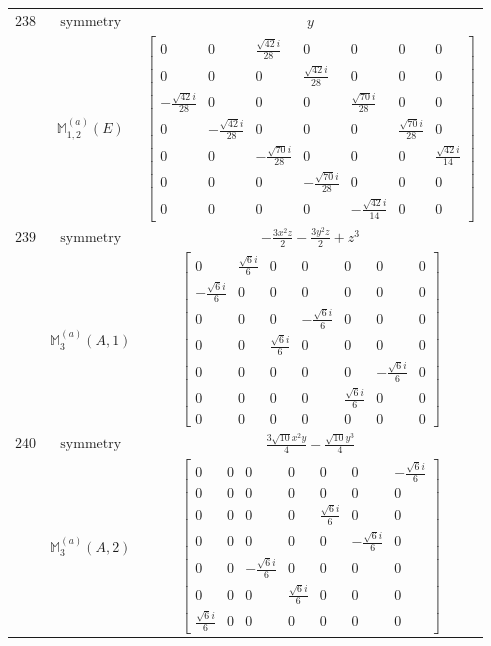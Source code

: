 \documentclass[fleqn,8pt,landscape]{jsarticle}
\begin{document}
\begin{longtable}{ccc}
$ 238 $ & $ \text{symmetry} $ & $ y $ \\
$  $ & $ \mathbb{M}_{1,2}^{(a)}(E) $ & $ \begin{bmatrix} 0 & 0 & \frac{\sqrt{42} i}{28} & 0 & 0 & 0 & 0 \\ 0 & 0 & 0 & \frac{\sqrt{42} i}{28} & 0 & 0 & 0 \\ - \frac{\sqrt{42} i}{28} & 0 & 0 & 0 & \frac{\sqrt{70} i}{28} & 0 & 0 \\ 0 & - \frac{\sqrt{42} i}{28} & 0 & 0 & 0 & \frac{\sqrt{70} i}{28} & 0 \\ 0 & 0 & - \frac{\sqrt{70} i}{28} & 0 & 0 & 0 & \frac{\sqrt{42} i}{14} \\ 0 & 0 & 0 & - \frac{\sqrt{70} i}{28} & 0 & 0 & 0 \\ 0 & 0 & 0 & 0 & - \frac{\sqrt{42} i}{14} & 0 & 0 \end{bmatrix} $ \\ \hline
$ 239 $ & $ \text{symmetry} $ & $ - \frac{3 x^{2} z}{2} - \frac{3 y^{2} z}{2} + z^{3} $ \\
$  $ & $ \mathbb{M}_{3}^{(a)}(A,1) $ & $ \begin{bmatrix} 0 & \frac{\sqrt{6} i}{6} & 0 & 0 & 0 & 0 & 0 \\ - \frac{\sqrt{6} i}{6} & 0 & 0 & 0 & 0 & 0 & 0 \\ 0 & 0 & 0 & - \frac{\sqrt{6} i}{6} & 0 & 0 & 0 \\ 0 & 0 & \frac{\sqrt{6} i}{6} & 0 & 0 & 0 & 0 \\ 0 & 0 & 0 & 0 & 0 & - \frac{\sqrt{6} i}{6} & 0 \\ 0 & 0 & 0 & 0 & \frac{\sqrt{6} i}{6} & 0 & 0 \\ 0 & 0 & 0 & 0 & 0 & 0 & 0 \end{bmatrix} $ \\ \hline
$ 240 $ & $ \text{symmetry} $ & $ \frac{3 \sqrt{10} x^{2} y}{4} - \frac{\sqrt{10} y^{3}}{4} $ \\
$  $ & $ \mathbb{M}_{3}^{(a)}(A,2) $ & $ \begin{bmatrix} 0 & 0 & 0 & 0 & 0 & 0 & - \frac{\sqrt{6} i}{6} \\ 0 & 0 & 0 & 0 & 0 & 0 & 0 \\ 0 & 0 & 0 & 0 & \frac{\sqrt{6} i}{6} & 0 & 0 \\ 0 & 0 & 0 & 0 & 0 & - \frac{\sqrt{6} i}{6} & 0 \\ 0 & 0 & - \frac{\sqrt{6} i}{6} & 0 & 0 & 0 & 0 \\ 0 & 0 & 0 & \frac{\sqrt{6} i}{6} & 0 & 0 & 0 \\ \frac{\sqrt{6} i}{6} & 0 & 0 & 0 & 0 & 0 & 0 \end{bmatrix} $ \\ \hline

\end{longtable}
\end{document}

